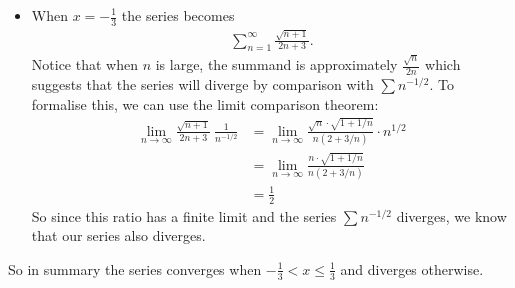 \begin{eg}[$\sum_{n=1}^\infty \frac{ (-3)^n \sqrt{n+1}}{2n+3}x^n$]
\begin{itemize}
\item When $x = -\frac{1}{3}$ the series becomes
\begin{align*}
\sum_{n=1}^\infty \frac{\sqrt{n+1}}{2n+3}.
\end{align*}
Notice that when $n$ is large, the summand is approximately
$\frac{\sqrt{n}}{2n}$ which suggests that the series will diverge
by comparison with $\sum n^{-1/2}$. To formalise this, we can use the limit comparison theorem:
\begin{align*}
  \lim_{n \to \infty} \frac{\sqrt{n+1}}{2n+3}\  \frac{1}{ n^{-1/2} }
  &=
  \lim_{n \to \infty} \frac{\sqrt{n} \cdot \sqrt{1+1/n}}{n(2+3/n)} \cdot n^{1/2}\\
  &=
  \lim_{n \to \infty} \frac{n \cdot \sqrt{1+1/n}}{n(2+3/n)} \\
  &= \frac{1}{2}
\end{align*}
So since this ratio has a finite limit and the series $\sum n^{-1/2}$ diverges, we know that our series also diverges.
\end{itemize}
So in summary the series converges when $-\frac{1}{3} < x \leq \frac{1}{3}$ and diverges otherwise.
\end{eg}

